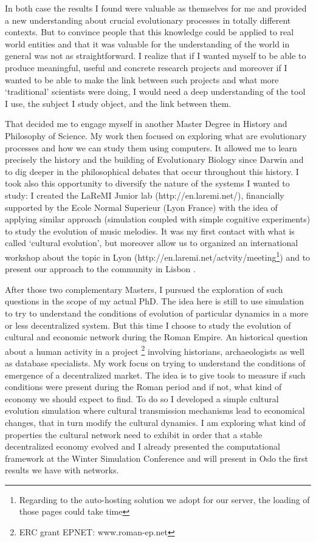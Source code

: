 \documentclass[10pt]{article}
\begin{document}
In both case the results I found were valuable as themselves for me and provided a new understanding about crucial evolutionary processes in totally different contexts. But to convince people that this knowledge could be applied to real world entities and that it was valuable for the understanding of the world in general was not as straightforward. I realize that if I wanted myself to be able to produce meaningful, useful and concrete research projects and moreover if I wanted to be able to make the link between such projects and what more ‘traditional’ scientists were doing, I would need a deep understanding of the tool I use, the subject I study object, and the link between them. 

That decided me to engage myself in another Master Degree in History and Philosophy of Science. My work then focused on exploring what are evolutionary processes and how we can study them using computers. It allowed me to learn precisely the history and the building of Evolutionary Biology since Darwin and to dig deeper in the philosophical debates that occur throughout this history. I took also this opportunity to diversify the nature of the systems I wanted to study: I created the LaReMI Junior lab (http://en.laremi.net/), financially supported by the Ecole Normal Superieur (Lyon France) with the idea of applying similar approach (simulation coupled with simple cognitive experiments) to study the evolution of music melodies. It was my first contact with what is called ‘cultural evolution’, but moreover allow us to organized an international workshop about the topic in Lyon (http://en.laremi.net/actvity/meeting\footnote{Regarding to the auto-hosting solution we adopt for our server, the loading of those pages could take time}) and to present our approach to the community in Lisbon \cite{carrignon2013whyapply}.

After those two complementary Masters, I pursued the exploration of such questions in the scope of my actual PhD. The idea here is still to use simulation to try to understand the conditions of evolution of particular dynamics in a more or less decentralized system. But this time I choose to study the evolution of cultural and economic network during the Roman Empire. An historical question about a human activity in a project \footnote{ERC grant EPNET: www.roman-ep.net} involving historians, archaeologists as well as database specialists. My work focus on trying to understand the conditions of emergence of a decentralized market. The idea is to give tools to measure if such conditions were present during the Roman period and if not, what kind of economy we should expect to find. To do so I developed a simple cultural evolution simulation where cultural transmission mechanisms lead to economical changes, that in turn modify the cultural dynamics. I am exploring what kind of properties the cultural network need to exhibit in order that a stable decentralized economy evolved and I already presented the computational framework at the Winter Simulation Conference \cite{carrignon2015modelingthecoevolutionoftradeandcultureinpastsocieties} and will present in Oslo \cite{carrignon2016coevolutionofcultureandtradeimpactofculturalnetworktopologyoneconomicdynamics} the first results we have with networks.
\end{document}
